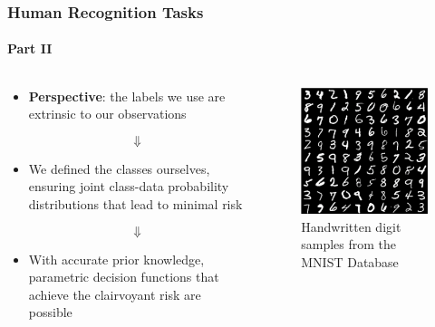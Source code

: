 \documentclass[aspectratio=169,usenames,dvipsnames]{beamer}
\begin{document}
\begin{frame}
\frametitle{Human Recognition Tasks}
\framesubtitle{Part II}


\begin{columns}[c]

\begin{column}{.5\linewidth}

\begin{itemize}
\item \textbf{Perspective}: the labels we use are \alert{extrinsic} to our observations

\vspace{-1em}
\Large
\begin{equation*} 
\Downarrow
\end{equation*}
\normalsize

\item We defined the classes ourselves, ensuring joint class-data probability distributions that lead to minimal risk

\vspace{-1em}
\Large
\begin{equation*} 
\Downarrow
\end{equation*}
\normalsize

\item With accurate prior knowledge, parametric decision functions that \alert{achieve the clairvoyant risk} are possible
\end{itemize}

\end{column}




\begin{column}{.5\linewidth}

\begin{figure}
\centering
\includegraphics[width=0.7\linewidth]{mnist_digit_ex.png}
\caption{Handwritten digit samples from the MNIST Database \cite{lecun-mnist}}
\label{fig:mnist_digit_ex}
\end{figure}

\end{column}

\end{columns}

\end{frame}
\end{document}
